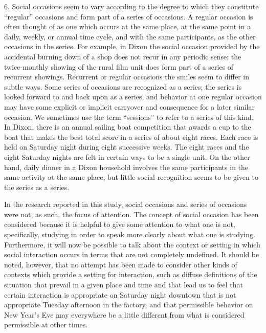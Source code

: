 \documentclass[openany,nobib]{tufte-book}
\begin{document}
6. Social occasions seem to vary according to the degree to which they
constitute ``regular'' occasions and form part of a series of occasions.
A regular occasion is often thought of as one which occurs at the same
place, at the same point in a daily, weekly, or annual time cycle, and
with the same participants, as the other occasions in the series. For
example, in Dixon the social occasion provided by the accidental burning
down of a shop does not recur in any periodic sense; the twice-monthly
showing of the rural film unit does form part of a series of recurrent
showings. Recurrent or regular occasions the smiles seem to differ in
subtle ways. Some series of occasions are recognized as a series; the
series is looked forward to and back upon as a series, and behavior at
one regular occasion may have some explicit or implicit carryover and
consequence for a later similar occasion. We sometimes use the term
``sessions'' to refer to a series of this kind. In Dixon, there is an
annual sailing boat competition that awards a cup to the boat that makes
the best total score in a series of about eight races. Each race is held
on Saturday night during eight successive weeks. The eight races and the
eight Saturday nights are felt in certain ways to be a single unit. On
the other hand, daily dinner in a Dixon household involves the same
participants in the same activity at the same place, but little social
recognition seems to be given to the series as a series.

\newpage In the research reported in this study, social occasions and series of
occasions were not, as such, the focus of attention. The concept of
social occasion has been considered because it is helpful to give some
attention to what one is not, specifically, studying in order to speak
more clearly about what one is studying. Furthermore, it will now be
possible to talk about the context or setting in which social
interaction occurs in terms that are not completely undefined. It should
be noted, however, that no attempt has been made to consider other kinds
of contexts which provide a setting for interaction, such as diffuse
definitions of the situation that prevail in a given place and time and
that lead us to feel that certain interaction is appropriate on Saturday
night downtown that is not appropriate Tuesday afternoon in the factory,
and that permissible behavior on New Year's Eve may everywhere be a
little different from what is considered permissible at other times.

\end{document}
